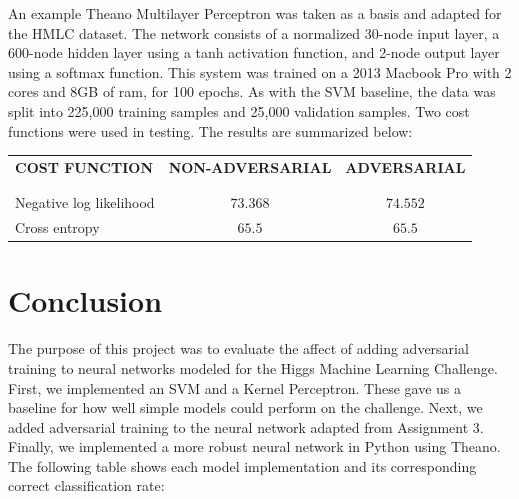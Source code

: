 \documentclass          {article} %
\begin{document}
An example Theano Multilayer Perceptron was taken as a basis and adapted for the HMLC dataset. The network consists of a normalized 30-node input layer, a 600-node hidden layer using a tanh activation function, and 2-node output layer using a softmax function. This system was trained on a 2013 Macbook Pro with 2 cores and 8GB of ram, for 100 epochs. As with the SVM baseline, the data was split into 225,000 training samples and 25,000 validation samples. Two cost functions were used in testing. The results are summarized below:

\begin{center}
\begin{tabular}{l c c}
{\bf COST FUNCTION} & {\bf NON-ADVERSARIAL} & {\bf ADVERSARIAL}\\
\\ \hline \\
Negative log likelihood & $73.368$ & $74.552$\\
Cross entropy           & $65.5$   & $65.5$\\
\end{tabular}
\end{center}


\section                {Conclusion}
\label                  {sec:conclusion}

The purpose of this project was to evaluate the affect of adding adversarial training to neural networks modeled for the Higgs Machine Learning Challenge. First, we implemented an SVM and a Kernel Perceptron. These gave us a baseline for how well simple models could perform on the challenge. Next, we added adversarial training to the neural network adapted from Assignment 3. Finally, we implemented a more robust neural network in Python using Theano. The following table shows each model implementation and its corresponding correct classification rate:
\end{document}
